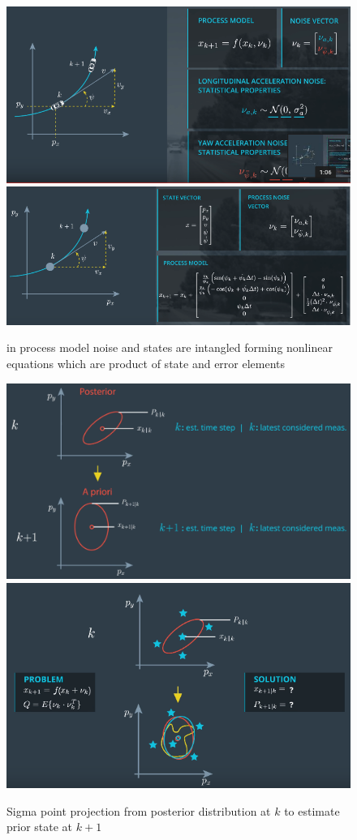 \documentclass[a4paper,12pt]{article}
\begin{document}
\begin{figure}[h!]
  \caption{in process model noise and states are intangled forming nonlinear equations which are product of state and error elements}
  \centering
    \includegraphics[scale=.5]{4.png}
    \includegraphics[scale=.5]{5.png}
\end{figure}
\begin{figure}[h!]
  \caption{Sigma point projection from posterior distribution at $k$ to estimate prior state at $k+1$}
  \centering
    \includegraphics[scale=.15]{6.png}
    \includegraphics[scale=.3]{7.png}
\end{figure}
\end{document}

